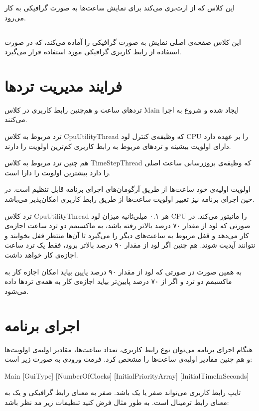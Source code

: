 \documentclass[oneside,a4paper,11pt]{report}
\begin{document}
	این کلاس که از 
	ارث‌بری می‌کند برای نمایش ساعت‌ها به صورت گرافیکی به کار می‌رود.
	
	\subsection{}
	این کلاس صفحه‌ی اصلی نمایش به صورت گرافیکی را آماده می‌کند، که در صورت استفاده از رابط کاربری گرافیکی مورد استفاده قرار می‌گیرد.
	
	
	\section{فرایند مدیریت تردها}
	
	تردهای ساعت و هم‌چنین رابط کاربری در کلاس Main ایجاد شده و شروع به اجرا می‌کنند. 
	
	ترد مربوط به کلاس CpuUtilityThread
	که وظیفه‌ی کنترل لود CPU را بر عهده دارد دارای اولویت بیشینه و تردهای مربوط به رابط کاربری کم‌ترین اولویت را دارند.
	
	هم چنین ترد مربوط به کلاس TimeStepThread که وظیفه‌ی بروزرسانی ساعت اصلی را دارد بیشترین اولویت را دارا است.
	
	اولویت اولیه‌ی خود ساعت‌ها از طریق آرگومان‌های اجرای برنامه قابل تنظیم است. در حین اجرای برنامه نیز تغییر اولویت ساعت‌ها از طریق رابط کاربری امکان‌پذیر می‌باشد.
	
	ترد کلاس CpuUtilityThread هر ۰.۱ میلی‌ثانیه میزان لود CPU را مانیتور می‌کند. در صورتی که لود از مقدار ۷۰ درصد بالاتر رفته باشد، به ماکسیمم دو ترد ساعت اجازه‌ی کار می‌دهد و قفل مربوط به ساعت‌های دیگر را می‌گیرد تا آن‌ها منتظر قفل بخوابند و نتوانند آپدیت شوند. هم چنین اگر لود از مقدار ۹۰ درصد بالاتر برود، فقط یک ترد ساعت اجازه‌ی کار خواهد داشت.
	
	به همین صورت در صورتی که لود از مقدار ۹۰ درصد پایین بیاید امکان اجازه کار به ماکسیمم دو ترد و اگر از ۷۰ درصد پایین‌تر بیاید اجازه‌ی کار به همه‌ی تردها داده می‌شود.
	
		\section{اجرای برنامه}
هنگام اجرای برنامه می‌توان نوع رابط کاربری، تعداد ساعت‌ها، مقادیر اولیه‌ی اولویت‌ها و هم چنین مقادیر اولیه‌ی ساعت‌ها را مشخص کرد. فرمت ورودی به صورت زیر است:		
\begin{latin}
Main [GuiType] [NumberOfClocks] [InitialPriorityArray] [InitialTimeInSeconds]

\end{latin}
	تایپ رابط کاربری می‌تواند صفر یا یک باشد. صفر به معنای رابط گرافیکی و یک به معنای رابط ترمینال است. به طور مثال فرض کنید تنظیمات زیر مد نظر باشد:
		
\end{document}
